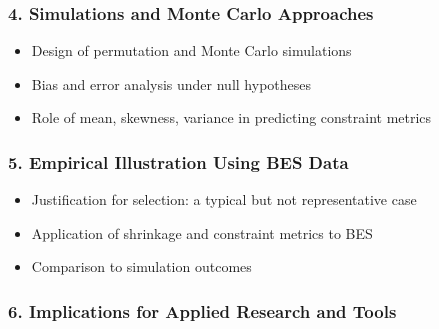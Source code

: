 \documentclass[
  12pt,
]{article}
\providecommand{\tightlist}{%
  \setlength{\itemsep}{0pt}\setlength{\parskip}{0pt}}\usepackage{longtable,booktabs,array}
\theoremstyle{plain}
\theoremstyle{definition}
\theoremstyle{remark}
\begin{document}
\subsubsection{\texorpdfstring{4. \textbf{Simulations and Monte Carlo
Approaches}}{4. Simulations and Monte Carlo Approaches}}\label{simulations-and-monte-carlo-approaches}

\begin{itemize}
\tightlist
\item
  Design of permutation and Monte Carlo simulations
\item
  Bias and error analysis under null hypotheses
\item
  Role of mean, skewness, variance in predicting constraint metrics
\end{itemize}

\subsubsection{\texorpdfstring{5. \textbf{Empirical Illustration Using
BES
Data}}{5. Empirical Illustration Using BES Data}}\label{empirical-illustration-using-bes-data}

\begin{itemize}
\tightlist
\item
  Justification for selection: a typical but not representative case
\item
  Application of shrinkage and constraint metrics to BES
\item
  Comparison to simulation outcomes
\end{itemize}

\subsubsection{\texorpdfstring{6. \textbf{Implications for Applied
Research and
Tools}}{6. Implications for Applied Research and Tools}}\label{implications-for-applied-research-and-tools}
\end{document}
